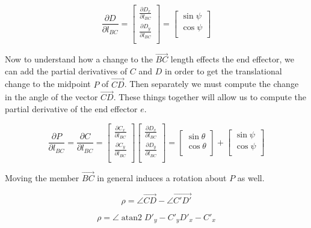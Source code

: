 \documentclass[11pt]{article}
\DeclareMathOperator{\atantwo}{atan2}
\begin{document}
\[
\frac{\partial D}{\partial  l_{BC}} = \begin{bmatrix}
           \frac{\partial D_x}{\partial l_{BC}} \\
           \frac{\partial D_y}{\partial l_{BC}} \\
         \end{bmatrix} = \begin{bmatrix}
           \sin{\psi}  \\
           \cos{\psi} \\
\end{bmatrix}
\]



Now to understand how a change to the $\vec{BC}$ length effects the end effector, we can
add the partial derivatives of $C$ and $D$ in order to get the translational change
to the midpoint $P$ of $\vec{CD}$. Then separately we must compute the change in the angle
of the vector $\vec{CD}$. These things together will allow us to compute the
partial derivative of the end effector $e$.

\[
\frac{\partial P}{\partial  l_{BC}} =
\frac{\partial C}{\partial  l_{BC}} = \begin{bmatrix}
           \frac{\partial C_x}{\partial l_{BC}} \\
           \frac{\partial C_y}{\partial l_{BC}} \\
         \end{bmatrix} \begin{bmatrix}
           \frac{\partial D_x}{\partial l_{BC}} \\
           \frac{\partial D_y}{\partial l_{BC}} \\
\end{bmatrix}
= \begin{bmatrix}
           \sin{\theta}  \\
           \cos{\theta} \\
         \end{bmatrix}
 +
 \begin{bmatrix}
           \sin{\psi}  \\
           \cos{\psi} \\
\end{bmatrix}
 \]

 Moving the member $\vec{BC}$ in general induces a rotation about $P$ as well.

 \[
 \rho = \angle{\vec{CD}} - \angle{\vec{C'D'}}
 \]

 \[
 \rho = \angle{\atantwo{D'_y - C'_y}{D'_x - C'_x}}
 \]
\end{document}
